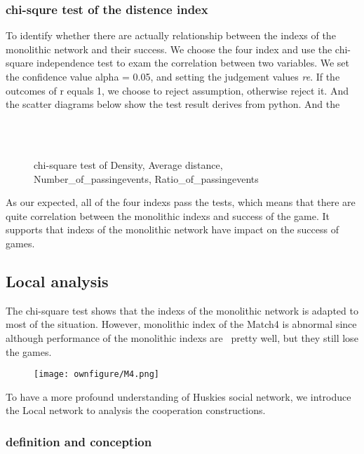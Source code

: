 \documentclass{mcmthesis}
\begin{document}
\subsubsection{chi-squre test of the distence index}
To identify whether there are actually relationship between the indexs of the monolithic network and their success.
We choose the four index and use the chi-square independence test to exam the correlation between two variables.
We set the confidence value alpha = 0.05, and setting the judgement values \textit{re}. If the outcomes of r equals 1, we
choose to reject assumption, otherwise reject it. And the scatter diagrams below show the test result derives from python.
And the 
\begin{figure}[H]
  \centering
  \\
  \hspace{0in}
  \\
  \caption{chi-square test of Density, Average distance, Number_of_passingevents, Ratio_of_passingevents}
\end{figure}

As our expected, all of the four indexs pass the tests, which means that there are quite correlation
between the monolithic indexs and success of the game. It supports that indexs of the monolithic network have 
impact on the success of games.

\subsection{Local analysis}
The chi-square test shows that the indexs of the monolithic network is adapted to most of the situation.
However, monolithic index of the Match4 is abnormal since although performance of the monolithic indexs are \
pretty well, but they still lose the games. 

\begin{figure}
  \centering
  \texttt{[image: ownfigure/M4.png]}
 \end{figure}

To have a more profound understanding of Huskies social network, we introduce the Local network to analysis
the cooperation constructions.

\subsubsection{definition and conception}
\end{document}
